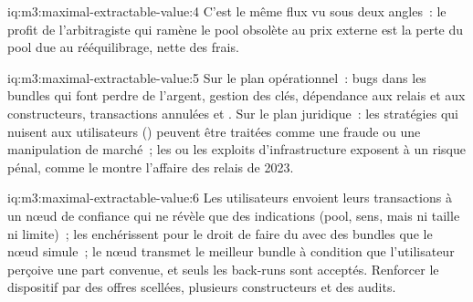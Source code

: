 \begin{solution}{iq:m3:maximal-extractable-value:4}
C'est le même flux vu sous deux angles~: le profit de l'arbitragiste qui ramène le pool obsolète au prix externe est la
perte du pool due au rééquilibrage, nette des frais.
\end{solution}

\begin{solution}{iq:m3:maximal-extractable-value:5}
Sur le plan opérationnel~: bugs dans les bundles qui font perdre de l'argent, gestion des clés, dépendance aux relais et aux constructeurs, transactions annulées et .
Sur le plan juridique~: les stratégies qui nuisent aux utilisateurs () peuvent être traitées comme une fraude ou une manipulation de marché~; les  ou les exploits
d'infrastructure exposent à un risque pénal, comme le montre l'affaire des relais de 2023.
\end{solution}

\begin{solution}{iq:m3:maximal-extractable-value:6}
Les utilisateurs envoient leurs transactions à un nœud de confiance qui ne révèle que des indications (pool, sens, mais ni taille ni limite)~; les  enchérissent pour le
droit de faire du  avec des bundles que le nœud simule~; le nœud transmet le meilleur bundle à condition que l'utilisateur perçoive une
part convenue, et seuls les back-runs sont acceptés. Renforcer le dispositif par des offres scellées, plusieurs constructeurs et des audits.
\end{solution}

